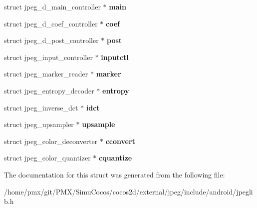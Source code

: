 \begin{DoxyCompactItemize}
struct jpeg\+\_\+d\+\_\+main\+\_\+controller $\ast$ {\bfseries main}
\item 
\mbox{\label{structjpeg__decompress__struct_ac0cea854c2daaae7310ccb9ebd16ef9e}} 
struct jpeg\+\_\+d\+\_\+coef\+\_\+controller $\ast$ {\bfseries coef}
\item 
\mbox{\label{structjpeg__decompress__struct_a5cc30c995d7f5e47b2f03b3d3eb295b5}} 
struct jpeg\+\_\+d\+\_\+post\+\_\+controller $\ast$ {\bfseries post}
\item 
\mbox{\label{structjpeg__decompress__struct_a90488cdeedacfd4fb1d881fe93c145e8}} 
struct jpeg\+\_\+input\+\_\+controller $\ast$ {\bfseries inputctl}
\item 
\mbox{\label{structjpeg__decompress__struct_a18f7650cc9455ea5aec62eff169d4933}} 
struct jpeg\+\_\+marker\+\_\+reader $\ast$ {\bfseries marker}
\item 
\mbox{\label{structjpeg__decompress__struct_a4386bd132276d7d3982bdbfbf3604bb7}} 
struct jpeg\+\_\+entropy\+\_\+decoder $\ast$ {\bfseries entropy}
\item 
\mbox{\label{structjpeg__decompress__struct_a9718bb2ceea857e72da381ed53aa514a}} 
struct jpeg\+\_\+inverse\+\_\+dct $\ast$ {\bfseries idct}
\item 
\mbox{\label{structjpeg__decompress__struct_a57799662d4378d759465fc52ccabac67}} 
struct jpeg\+\_\+upsampler $\ast$ {\bfseries upsample}
\item 
\mbox{\label{structjpeg__decompress__struct_a52cb89e32b4bafff9f0098054110ea6c}} 
struct jpeg\+\_\+color\+\_\+deconverter $\ast$ {\bfseries cconvert}
\item 
\mbox{\label{structjpeg__decompress__struct_a052fe066fbef4377b6d8a37d27b742c1}} 
struct jpeg\+\_\+color\+\_\+quantizer $\ast$ {\bfseries cquantize}
\end{DoxyCompactItemize}


The documentation for this struct was generated from the following file\+:\begin{DoxyCompactItemize}
\item 
/home/pmx/git/\+P\+M\+X/\+Simu\+Cocos/cocos2d/external/jpeg/include/android/jpeglib.\+h\end{DoxyCompactItemize}
